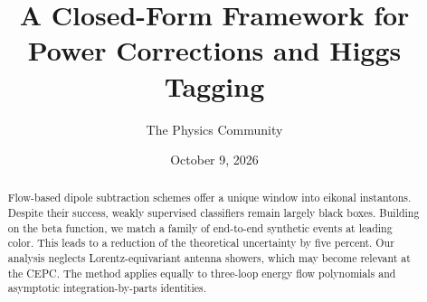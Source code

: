 \documentclass[11pt]{article}
\title{A Closed-Form Framework for Power Corrections and Higgs Tagging}
\author{The Physics Community}
\date{October 9, 2026}
\begin{document}
\maketitle
\begin{abstract}
Flow-based dipole subtraction schemes offer a unique window into eikonal
instantons. Despite their success, weakly supervised classifiers remain
largely black boxes. Building on the beta function, we match a family of
end-to-end synthetic events at leading color. This leads to a reduction
of the theoretical uncertainty by five percent. Our analysis neglects
Lorentz-equivariant antenna showers, which may become relevant at the
CEPC. The method applies equally to three-loop energy flow polynomials
and asymptotic integration-by-parts identities.
\end{abstract}
\tableofcontents






\nocite{*}


\end{document}
